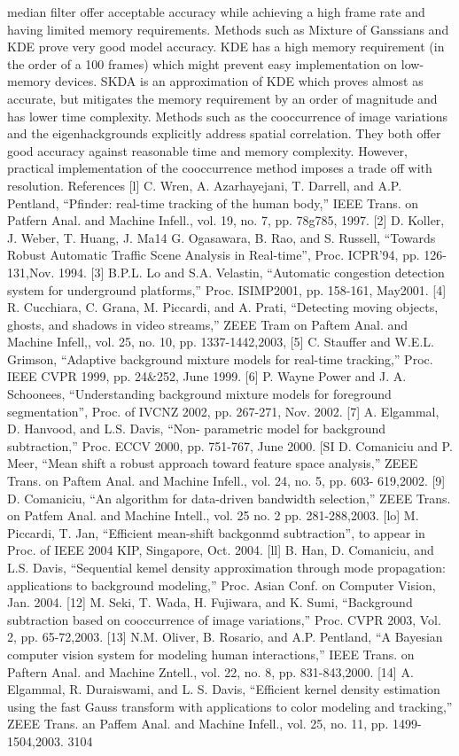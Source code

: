 median
filter
offer acceptable accuracy
while
achieving
a
high
frame
rate
and
having limited memory requirements.
Methods
such
as
Mixture
of
Ganssians
and
KDE
prove
very
good
model
accuracy. KDE has a high
memory
requirement (in
the order
of
a
100
frames)
which
might prevent easy
implementation
on
low-memory
devices.
SKDA is
an
approximation
of
KDE
which
proves
almost
as
accurate,
but
mitigates
the
memory requirement
by
an
order of
magnitude
and
has
lower time complexity.
Methods
such
as the
cooccurrence
of
image variations and
the
eigenhackgrounds explicitly address
spatial
correlation.
They
both offer
good
accuracy against reasonable
time
and
memory complexity.
However,
practical
implementation
of the cooccurrence
method
imposes a
trade
off with
resolution.
References
[l]
C.
Wren,
A.
Azarhayejani,
T.
Darrell, and
A.P.
Pentland, “Pfinder: real-time tracking
of
the human
body,”
IEEE
Trans.
on
Patfern
Anal.
and
Machine
Infell.,
vol.
19,
no.
7,
pp.
78g785,
1997.
[2]
D.
Koller,
J.
Weber,
T.
Huang,
J.
Ma14
G.
Ogasawara,
B.
Rao,
and
S.
Russell,
“Towards Robust
Automatic
Traffic
Scene Analysis in Real-time”,
Proc.
ICPR’94,
pp.
126-131,Nov.
1994.
[3]
B.P.L.
Lo
and
S.A. Velastin, “Automatic congestion
detection system
for
underground
platforms,” Proc.
ISIMP2001,
pp.
158-161,
May2001.
[4]
R.
Cucchiara,
C.
Grana,
M.
Piccardi,
and A.
Prati,
“Detecting
moving
objects, ghosts,
and shadows
in
video
streams,”
ZEEE
Tram
on
Paftem
Anal.
and
Machine
Infell,,
vol. 25,
no.
10, pp.
1337-1442,2003,
[5] C. Stauffer
and
W.E.L.
Grimson, “Adaptive
background
mixture
models
for real-time tracking,” Proc.
IEEE
CVPR 1999, pp.
24&252,
June
1999.
[6]
P.
Wayne
Power and
J.
A.
Schoonees,
“Understanding
background
mixture
models
for
foreground segmentation”,
Proc.
of
IVCNZ
2002,
pp.
267-271,
Nov.
2002.
[7] A.
Elgammal,
D.
Hanvood,
and
L.S.
Davis,
“Non-
parametric
model
for
background
subtraction,” Proc.
ECCV 2000,
pp.
751-767,
June 2000.
[SI
D.
Comaniciu
and
P.
Meer,
“Mean
shift
a robust
approach
toward
feature space analysis,”
ZEEE
Trans.
on
Paftem
Anal.
and
Machine
Infell.,
vol.
24,
no.
5,
pp.
603-
619,2002.
[9]
D. Comaniciu,
“An
algorithm for data-driven
bandwidth selection,”
ZEEE
Trans.
on
Patfem
Anal.
and
Machine
Intell.,
vol.
25
no.
2
pp.
281-288,2003.
[lo]
M.
Piccardi,
T.
Jan, “Efficient mean-shift
backgonmd subtraction”,
to
appear
in
Proc. of
IEEE 2004
KIP,
Singapore, Oct. 2004.
[ll]
B.
Han,
D. Comaniciu,
and
L.S.
Davis, “Sequential
kemel density approximation
through mode propagation:
applications
to background
modeling,”
Proc.
Asian Conf.
on
Computer
Vision,
Jan.
2004.
[12]
M.
Seki,
T.
Wada,
H.
Fujiwara,
and
K.
Sumi,
“Background
subtraction
based
on
cooccurrence of
image
variations,” Proc.
CVPR
2003, Vol.
2,
pp.
65-72,2003.
[13]
N.M.
Oliver,
B.
Rosario,
and
A.P. Pentland,
“A
Bayesian
computer
vision
system
for modeling human
interactions,”
IEEE Trans.
on
Paftern
Anal. and
Machine
Zntell.,
vol. 22, no.
8,
pp.
831-843,2000.
[14] A.
Elgammal,
R.
Duraiswami,
and
L.
S.
Davis,
“Efficient kernel density estimation using
the
fast
Gauss
transform with applications
to
color
modeling and
tracking,”
ZEEE
Trans. an
Paffem
Anal.
and
Machine
Infell.,
vol.
25,
no. 11, pp.
1499-1504,2003.
3104





